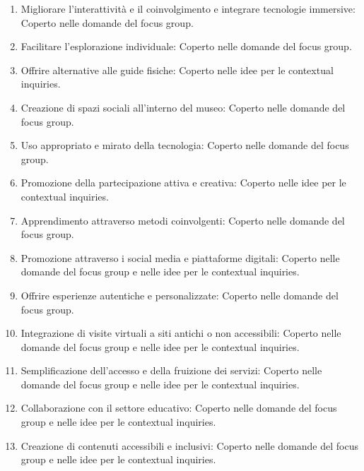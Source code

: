 \documentclass{article}
\begin{document}
\begin{enumerate}
    \item Migliorare l’interattività e il coinvolgimento e integrare tecnologie immersive: Coperto nelle domande del focus group.
    \item Facilitare l’esplorazione individuale: Coperto nelle domande del focus group.
    \item Offrire alternative alle guide fisiche: Coperto nelle idee per le contextual inquiries.
    \item Creazione di spazi sociali all’interno del museo: Coperto nelle domande del focus group.
    \item Uso appropriato e mirato della tecnologia: Coperto nelle domande del focus group.
    \item Promozione della partecipazione attiva e creativa: Coperto nelle idee per le contextual inquiries.
    \item Apprendimento attraverso metodi coinvolgenti: Coperto nelle domande del focus group.
    \item Promozione attraverso i social media e piattaforme digitali: Coperto nelle domande del focus group e nelle idee per le contextual inquiries.
    \item Offrire esperienze autentiche e personalizzate: Coperto nelle domande del focus group.
    \item Integrazione di visite virtuali a siti antichi o non accessibili: Coperto nelle domande del focus group e nelle idee per le contextual inquiries.
    \item Semplificazione dell’accesso e della fruizione dei servizi: Coperto nelle domande del focus group e nelle idee per le contextual inquiries.
    \item Collaborazione con il settore educativo: Coperto nelle domande del focus group e nelle idee per le contextual inquiries.
    \item Creazione di contenuti accessibili e inclusivi: Coperto nelle domande del focus group e nelle idee per le contextual inquiries.
\end{enumerate}
\end{document}
